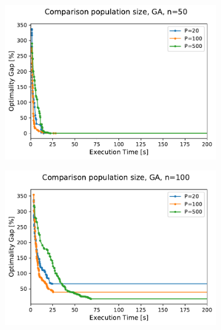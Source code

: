 \documentclass[12pt]{article}
\begin{document}
  \begin{figure}
        \centering
        \begin{subfigure}[b]{0.475\textwidth}
            \centering
            \includegraphics[width=\textwidth]{figures/ga_50_population_comparison.pdf}
            \caption%
            {{\small }}    
            \label{fig:mean and std of net14}
        \end{subfigure}
        \hfill
        \begin{subfigure}[b]{0.475\textwidth}  
            \centering 
            \includegraphics[width=\textwidth]{figures/ga_100_population_comparison.pdf}
            \caption%
            {{\small }}     
            \label{fig:mean and std of net24}
        \end{subfigure}

\end{figure}
\end{document}

